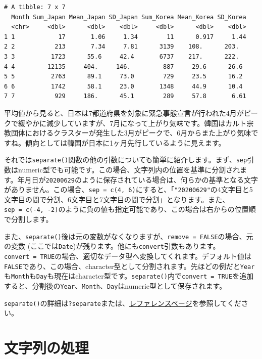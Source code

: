 \documentclass[
  a4paper,
  pandoc,
  ja=standard,
  jafont=haranoaji]{bxjsbook}
\begin{document}
\begin{verbatim}
# A tibble: 7 x 7
  Month Sum_Japan Mean_Japan SD_Japan Sum_Korea Mean_Korea SD_Korea
  <chr>     <dbl>      <dbl>    <dbl>     <dbl>      <dbl>    <dbl>
1 1            17       1.06     1.34        11      0.917     1.44
2 2           213       7.34     7.81      3139    108.      203.  
3 3          1723      55.6     42.4       6737    217.      222.  
4 4         12135     404.     146.         887     29.6      26.6 
5 5          2763      89.1     73.0        729     23.5      16.2 
6 6          1742      58.1     23.0       1348     44.9      10.4 
7 7           929     186.      45.1        289     57.8       6.61
\end{verbatim}

平均値から見ると、日本は7都道府県を対象に緊急事態宣言が行われた4月がピークで緩やかに減少していますが、7月になって上がり気味です。韓国はカルト宗教団体におけるクラスターが発生した3月がピークで、6月からまた上がり気味ですね。傾向としては韓国が日本に1ヶ月先行しているように見えます。

それでは\texttt{separate()}関数の他の引数についても簡単に紹介します。まず、\texttt{sep}引数はnumeric型でも可能です。この場合、文字列内の位置を基準に分割されます。年月日が\texttt{20200629}のように保存されている場合は、何らかの基準となる文字がありません。この場合、\texttt{sep\ =\ c(4,\ 6)}にすると、「\texttt{"20200629"}の4文字目と5文字目の間で分割、6文字目と7文字目の間で分割」となります。また、\texttt{sep\ =\ c(-4,\ -2)}のように負の値も指定可能であり、この場合は右からの位置順で分割します。

また、\texttt{separate()}後は元の変数がなくなりますが、\texttt{remove\ =\ FALSE}の場合、元の変数
(ここでは\texttt{Date})が残ります。他にも\texttt{convert}引数もあります。\texttt{convert\ =\ TRUE}の場合、適切なデータ型へ変換してくれます。デフォルト値は\texttt{FALSE}であり、この場合、character型として分割されます。先ほどの例だと\texttt{Year}も\texttt{Month}も\texttt{Day}も現在はcharacter型です。\texttt{separate()}内で\texttt{convert\ =\ TRUE}を追加すると、分割後の\texttt{Year}、\texttt{Month}、\texttt{Day}はnumeric型として保存されます。

\texttt{separate()}の詳細は\texttt{?separate}または、\href{https://tidyr.tidyverse.org/reference/separate.html}{レファレンスページ}を参照してください。

\hypertarget{sec-string}{%
\chapter{文字列の処理}\label{sec-string}}
\end{document}
